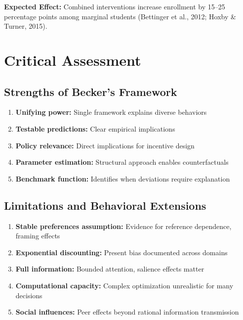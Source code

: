 \begin{tcolorbox}[colback=yellow!5!white,colframe=yellow!75!black,title=Worked Example: College Enrollment Decision]
\textbf{Expected Effect:} Combined interventions increase enrollment by 15--25 percentage points among marginal students (Bettinger et al., 2012; Hoxby \& Turner, 2015).
\end{tcolorbox}

\section{Critical Assessment}
\label{sec:gb-critical}

\subsection{Strengths of Becker's Framework}

\begin{enumerate}
    \item \textbf{Unifying power:} Single framework explains diverse behaviors
    \item \textbf{Testable predictions:} Clear empirical implications
    \item \textbf{Policy relevance:} Direct implications for incentive design
    \item \textbf{Parameter estimation:} Structural approach enables counterfactuals
    \item \textbf{Benchmark function:} Identifies when deviations require explanation
\end{enumerate}

\subsection{Limitations and Behavioral Extensions}

\begin{enumerate}
    \item \textbf{Stable preferences assumption:} Evidence for reference dependence, framing effects
    \item \textbf{Exponential discounting:} Present bias documented across domains
    \item \textbf{Full information:} Bounded attention, salience effects matter
    \item \textbf{Computational capacity:} Complex optimization unrealistic for many decisions
    \item \textbf{Social influences:} Peer effects beyond rational information transmission
\end{enumerate}

